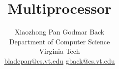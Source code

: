 \documentclass[letterpaper,twocolumn,10pt]{article}
\begin{document}
\newcommand{\jquerychatscaleout}{
    \begin{figure}[ht]
    \centering
    \texttt{[image: gnuplot/jquerychat\_scaleout]}
    \caption{Throughput and latency for chat application with JQuery.}
    \label{fig:jquerychatscaleout}
    \end{figure}
}

\title{\Large \bf Multiprocessor \cb}

\author{Xiaozhong Pan  \qquad  Godmar Back\\
Department of Computer Science\\ 
Virginia Tech\\
\url{bladepan@cs.vt.edu} \qquad  \url{gback@cs.vt.edu}
}




\maketitle
\thispagestyle{empty}


\newpage







\newpage

{\footnotesize 
}

\end{document}
